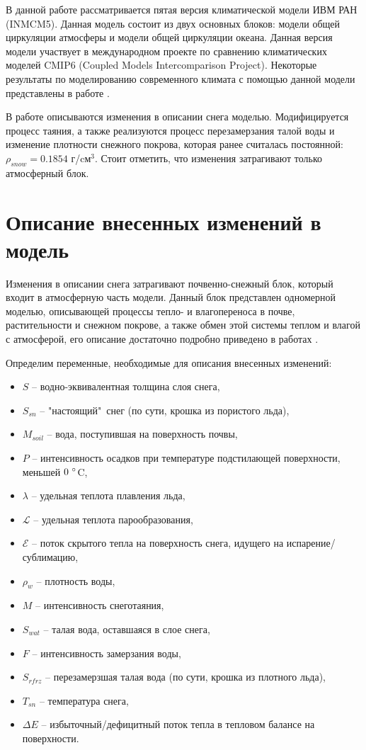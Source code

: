 \documentclass[a4paper, fontsize=12pt]{scrartcl}
\begin{document}
В данной работе рассматривается пятая версия климатической модели ИВМ РАН (INMCM5). Данная модель состоит из двух основных блоков: модели общей циркуляции атмосферы и модели общей циркуляции океана. Данная версия модели участвует в международном проекте по сравнению климатических моделей CMIP6 (Coupled Models Intercomparison Project). Некоторые результаты по моделированию современного климата с помощью данной модели представлены в работе \cite{Volodin2017}.

В работе описываются изменения в описании снега моделью. Модифицируется процесс таяния, а также реализуются процесс перезамерзания талой воды и изменение плотности снежного покрова, которая ранее считалась постоянной: $\rho_{snow} = 0.1854 $ г/cм$^3$. Стоит отметить, что изменения затрагивают только атмосферный блок.


\section{Описание внесенных изменений в модель}

Изменения в описании снега затрагивают почвенно-снежный блок, который входит в атмосферную часть модели. Данный блок представлен одномерной моделью, описывающей процессы тепло- и влагопереноса в почве, растительности и снежном покрове, а также обмен этой системы теплом и влагой с атмосферой, его описание достаточно подробно приведено в работах \cite{Volodin1998, Volodina2000}.  

Определим переменные, необходимые для описания внесенных изменений: 
\begin{itemize}
    \item $S$ -- водно-эквивалентная толщина слоя снега,
    \item $S_{sn}$ -- "настоящий"\  снег (по сути, крошка из пористого льда), 
    \item $M_{soil}$ -- вода, поступившая на поверхность почвы,
    \item $P$ -- интенсивность осадков при температуре подстилающей поверхности, меньшей $0 ~\degree$C,
    \item $\lambda$ -- удельная теплота плавления льда, 
    \item $\mathcal{L}$ -- удельная теплота парообразования, 
    \item $\mathcal{E}$ -- поток скрытого тепла на поверхность снега, идущего на испарение/сублимацию,
    \item $\rho_w$ -- плотность воды,
    \item $M$ -- интенсивность снеготаяния,
    \item $S_{wat}$ -- талая вода, оставшаяся в слое снега,
    \item $F$ -- интенсивность замерзания воды,
    \item $S_{rfrz}$ -- перезамерзшая талая вода (по сути, крошка из плотного льда),
    \item $T_{sn}$ -- температура снега, 
    \item $\Delta E$ -- избыточный/дефицитный поток тепла в тепловом балансе на поверхности.
\end{itemize}
\end{document}
